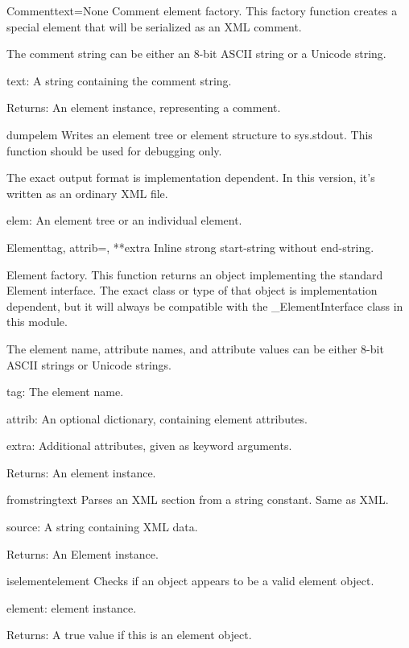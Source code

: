 \begin{funcdesc}{Comment}{text=None}
Comment element factory.  This factory function creates a special
element that will be serialized as an XML comment.

The comment string can be either an 8-bit ASCII string or a Unicode
string.

text: A string containing the comment string.

Returns: An element instance, representing a comment.
\end{funcdesc}

\begin{funcdesc}{dump}{elem}
Writes an element tree or element structure to sys.stdout.  This
function should be used for debugging only.

The exact output format is implementation dependent.  In this
version, it's written as an ordinary XML file.

elem: An element tree or an individual element.
\end{funcdesc}

\begin{funcdesc}{Element}{tag, attrib={}, **extra}
Inline strong start-string without end-string.


Element factory.  This function returns an object implementing the
standard Element interface.  The exact class or type of that object
is implementation dependent, but it will always be compatible with
the {\_}ElementInterface class in this module.

The element name, attribute names, and attribute values can be
either 8-bit ASCII strings or Unicode strings.

tag: The element name.

attrib: An optional dictionary, containing element attributes.

extra: Additional attributes, given as keyword arguments.

Returns: An element instance.
\end{funcdesc}

\begin{funcdesc}{fromstring}{text}
Parses an XML section from a string constant.  Same as XML.

source: A string containing XML data.

Returns: An Element instance.
\end{funcdesc}

\begin{funcdesc}{iselement}{element}
Checks if an object appears to be a valid element object.

element: element instance.

Returns: A true value if this is an element object.
\end{funcdesc}


